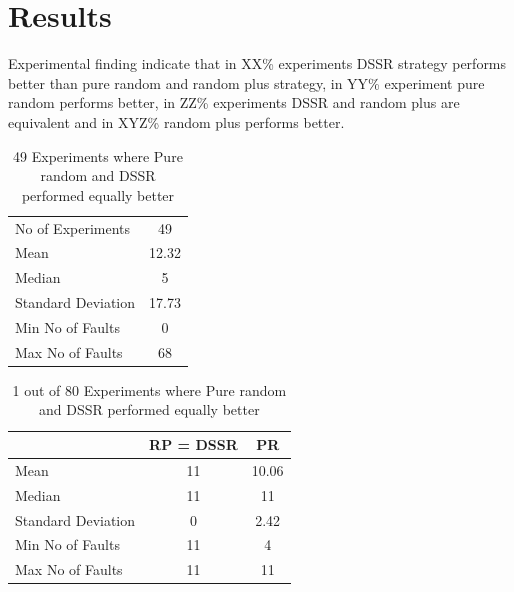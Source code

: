\documentclass[conference]{IEEEtran}
\begin{document}

\section{Results}
Experimental finding indicate that in XX\% experiments DSSR strategy performs better than pure random and random plus strategy, in YY\% experiment pure random performs better, in ZZ\% experiments DSSR and random plus are equivalent and in XYZ\% random plus performs better. 





\begin{table}[H]
\caption{49 Experiments where Pure random and DSSR performed equally better}
\centering
\begin{tabular}{|l|c|}
\hline\hline
No of Experiments 	& 49  	\\
Mean  			& 12.32  	\\
Median 			& 5 		\\
Standard Deviation 	& 17.73  	\\
Min No of Faults	&  0  		\\
Max No of Faults 	& 68  	\\
\hline
\end{tabular}
\label{table:nonlin}
\end{table}





\begin{table}[H]
\caption{1 out of 80 Experiments where Pure random and DSSR performed equally better}
\centering
\begin{tabular}{|l|c|c|}
\hline\hline
 				& RP = DSSR			&  PR \\[1ex]
\hline
Mean  			&    11				&  10.06\\
Median 			&    11 				&  11\\
Standard Deviation 	&    0					&  2.42\\
Min No of Faults	&    11				&  4\\
Max No of Faults 	&    11				&  11\\
\hline
\end{tabular}
\label{table:result5}
\end{table}




\end{document}
